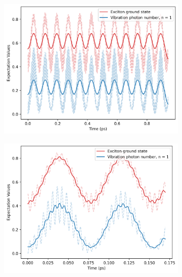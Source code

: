 \documentclass[11pt]{article}
\begin{document}
\begin{figure}[H]
    \centering
    \begin{subfigure}{0.49\textwidth}
        \centering
        \includegraphics[width=\linewidth]{Research Project/Code/results/ExVib/Closed/Envelope/pops_ground_eg.png}
        \caption{}
        \label{fig:EVM_CQS_Pop_env_eg}
    \end{subfigure}
    \hfill
    \begin{subfigure}{0.49\textwidth}
        \centering
        \includegraphics[width=\linewidth]{Research Project/Code/results/ExVib/Closed/Fast/pops_ground_eg.png}
        \caption{}
        \label{fig:EVM_CQS_Pop_fast_eg}
    \end{subfigure}
    
    \caption{}
    \label{fig:EVM_CQS_Pops_eg}
\end{figure}
\end{document}
